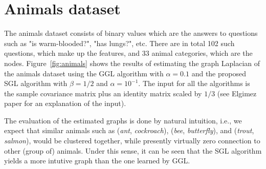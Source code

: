 \section{Animals dataset}

The \textsf{animals} dataset consists of binary values which are the answers to questions such as
"is warm-blooded?", "has lungs?", etc. There are in total 102 such questions, which make up the features, and
33 animal categories, which are the nodes. Figure~\ref{fig:animals} shows the results of estimating the
graph Laplacian of the \textsf{animals} dataset using the \textsf{GGL} algorithm with $\alpha = 0.1$ and
the proposed \textsf{SGL} algorithm with $\beta = 1/2$ and $\alpha = 10^{-1}$. The input for all the algorithms
is the sample covariance matrix plus an identity matrix scaled by $1/3$ (see Elgimez paper for an explanation of
the input).

The evaluation of the estimated graphs is done by natural intuition, i.e., we expect that similar animals
such as (\textit{ant}, \textit{cockroach}), (\textit{bee}, \textit{butterfly}), and
(\textit{trout}, \textit{salmon}), would be clustered together, while presently virtually zero connection to
other (group of) animals. Under this sense, it can be seen that the \textsf{SGL} algorithm yields a more intutive
graph than the one learned by \textsf{GGL}.

